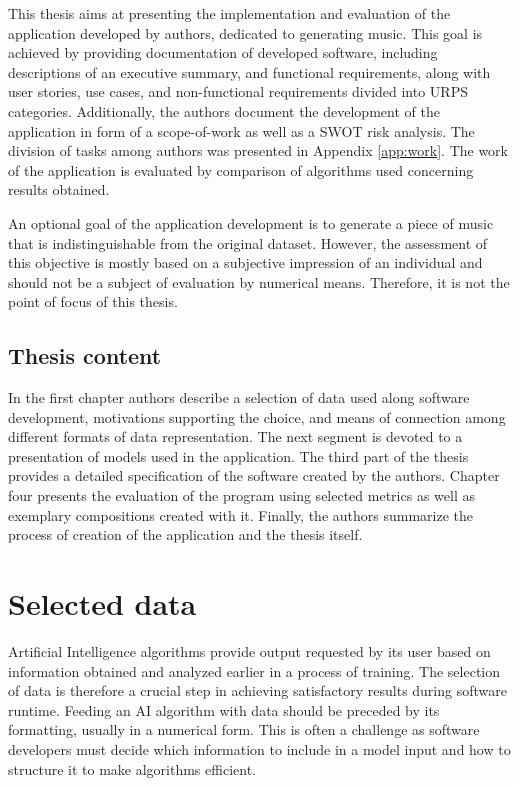 \documentclass[a4paper, 11pt, twoside]{report}
\theoremstyle{definition}
\begin{document}
This thesis aims at presenting the implementation and evaluation of the application developed by authors, dedicated to generating music. This goal is achieved by providing documentation of developed software, including descriptions of an executive summary, and functional requirements, along with user stories, use cases, and non-functional requirements divided into URPS categories. Additionally, the authors document the development of the application in form of a scope-of-work as well as a SWOT risk analysis. The division of tasks among authors was presented in Appendix \ref{app:work}. The work of the application is evaluated by comparison of algorithms used concerning results obtained. \par
An optional goal of the application development is to generate a piece of music that is indistinguishable from the original dataset. However, the assessment of this objective is mostly based on a subjective impression of an individual and should not be a subject of evaluation by numerical means. Therefore, it is not the point of focus of this thesis. \par


\section*{Thesis content}

In the first chapter authors describe a selection of data used along software development, motivations supporting the choice, and means of connection among different formats of data representation. The next segment is devoted to a presentation of models used in the application. The third part of the thesis provides a detailed specification of the software created by the authors. Chapter four presents the evaluation of the program using selected metrics as well as exemplary compositions created with it. Finally, the authors summarize the process of creation of the application and the thesis itself. \par



\chapter{Selected data} \label{chapter:selected_data}

Artificial Intelligence algorithms provide output requested by its user based on information obtained and analyzed earlier in a process of training. The selection of data is therefore a crucial step in achieving satisfactory results during software runtime. Feeding an AI algorithm with data should be preceded by its formatting, usually in a numerical form. This is often a challenge as software developers must decide which information to include in a model input and how to structure it to make algorithms efficient. \par
\end{document}
